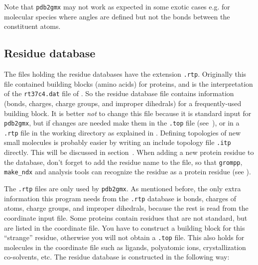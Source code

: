 Note that {\tt pdb2gmx} may not work as expected in some exotic cases
e.g. for molecular species where angles are defined but not the bonds
between the constituent atoms.


\subsection{Residue database}
\label{subsec:rtp}
The files holding the residue databases have the extension {\tt .rtp}.
Originally this file contained building blocks (amino acids) for proteins,
and is the {\gromacs} interpretation of the {\tt rt37c4.dat} file of {\gromos}.
So the residue database file contains information (bonds, charges, charge groups,
and improper dihedrals) for a frequently-used building block. It is
better {\em not} to change this file because it is standard input for
{\tt pdb2gmx}, but if changes are needed make them in the
{\tt *.top} file (see~), or in a {\tt .rtp} file
in the working directory as explained in .
Defining topologies of new small molecules is probably easier
by writing an include topology file {\tt *.itp} directly.
This will be discussed in section~.
When adding a new protein residue to the database, don't forget to
add the residue name to the {\tt {}} file,
so that {\tt grompp}, {\tt make_ndx} and analysis tools can recognize
the residue as a protein residue (see ).

The {\tt .rtp} files are only used by {\tt pdb2gmx}.
As mentioned before, the only extra information this
program needs from the {\tt .rtp} database is bonds, charges of atoms,
charge groups, and improper dihedrals, because the rest is read from
the coordinate input file.
Some proteins contain residues that are not standard, but are
listed in the coordinate file. You have to construct a building block
for this ``strange'' residue, otherwise you will not obtain a
{\tt *.top} file. This also holds for molecules in the
coordinate file such as ligands, polyatomic ions, crystallization co-solvents, etc.
The residue database is constructed in the following way:

